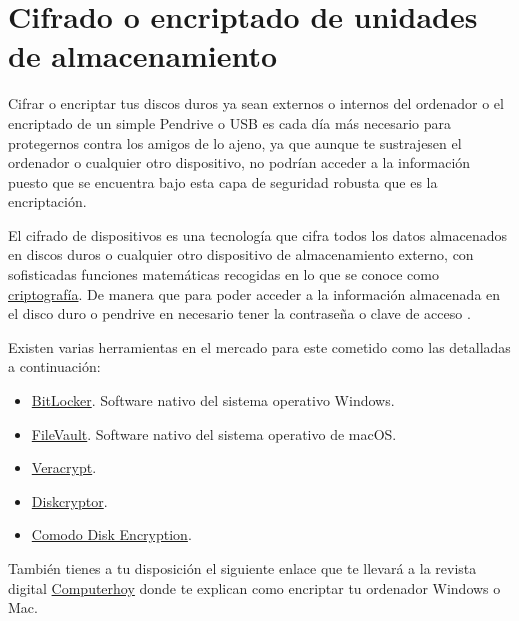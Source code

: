 \documentclass[
  spanish,
  a4paper,
  openany]{book}
\begin{document}
\hypertarget{cifrado-o-encriptado-de-unidades-de-almacenamiento}{%
\section{Cifrado o encriptado de unidades de almacenamiento}\label{cifrado-o-encriptado-de-unidades-de-almacenamiento}}

Cifrar o encriptar tus discos duros ya sean externos o internos del ordenador o el encriptado de un simple Pendrive o USB es cada día más necesario para protegernos contra los amigos de lo ajeno, ya que aunque te sustrajesen el ordenador o cualquier otro dispositivo, no podrían acceder a la información puesto que se encuentra bajo esta capa de seguridad robusta que es la encriptación.

El cifrado de dispositivos es una tecnología que cifra todos los datos almacenados en discos duros o cualquier otro dispositivo de almacenamiento externo, con sofisticadas funciones matemáticas recogidas en lo que se conoce como \href{https://es.wikipedia.org/wiki/Criptografía}{criptografía}. De manera que para poder acceder a la información almacenada en el disco duro o pendrive en necesario tener la contraseña o clave de acceso \citep{cifrado}.

Existen varias herramientas en el mercado para este cometido como las detalladas a continuación:

\begin{itemize}
\item
  \href{https://docs.microsoft.com/es-es/windows/security/information-protection/bitlocker/bitlocker-overview}{BitLocker}. Software nativo del sistema operativo Windows.
\item
  \href{https://support.apple.com/es-es/HT204837}{FileVault}. Software nativo del sistema operativo de macOS.
\item
  \href{https://www.veracrypt.fr}{Veracrypt}.
\item
  \href{https://diskcryptor.org/}{Diskcryptor}.
\item
  \href{https://www.comodo.com/home/internet-security/disk-encryption.php}{Comodo Disk Encryption}.
\end{itemize}

También tienes a tu disposición el siguiente enlace que te llevará a la revista digital \href{https://computerhoy.com/tutoriales/tecnologia/como-cifrar-disco-duro-memoria-externa-nadie-pueda-acceder-ella-386434}{Computerhoy} donde te explican como encriptar tu ordenador Windows o Mac.
\end{document}
